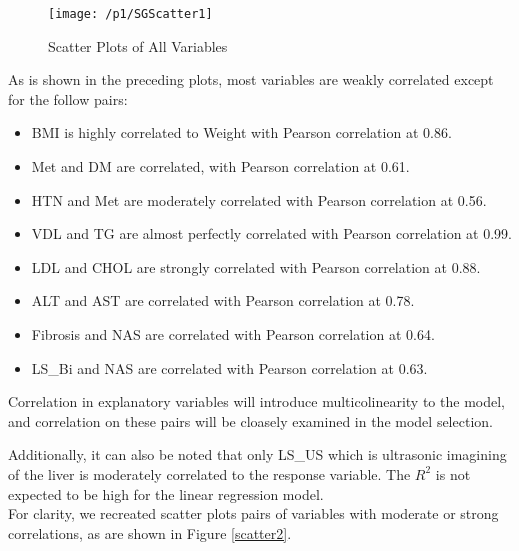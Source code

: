 \documentclass{article}
\begin{document}
\begin{minipage}{\textwidth}		
\begin{figure}[H]
\centering
\texttt{[image: /p1/SGScatter1]}
\caption{Scatter Plots of All Variables}
\label{scatter}
\end{figure}
\end{minipage} \hfill

As is shown in the preceding plots, most variables are weakly correlated except for the follow pairs:
\begin{itemize}
	\item BMI is highly correlated to Weight with Pearson correlation at 0.86. 
	\item Met and DM are correlated, with Pearson correlation at 0.61.
	\item HTN and Met are moderately correlated with Pearson correlation at 0.56.
	\item VDL and TG are almost perfectly correlated with Pearson correlation at 0.99.
	\item LDL and CHOL are strongly correlated with Pearson correlation at 0.88.
	\item ALT and AST are correlated with Pearson correlation at 0.78.
	\item Fibrosis and NAS are correlated with Pearson correlation at 0.64.
	\item LS\_Bi and NAS are correlated with Pearson correlation at 0.63.
\end{itemize}

Correlation in explanatory variables will introduce multicolinearity to the model, and correlation on these pairs will be cloasely examined in the model selection. 

Additionally, it can also be noted that only LS\_US which is ultrasonic imagining of the liver is moderately correlated to the response variable. The $R^2$ is not expected to be high for the linear regression model.\\

For clarity, we recreated scatter plots pairs of variables with moderate or strong correlations, as are shown in Figure \ref{scatter2}. 
\end{document}
